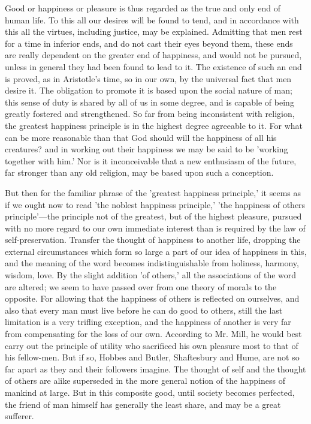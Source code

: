 \documentclass[11pt,letter]{article}
\begin{document}
\par  Good or happiness or pleasure is thus regarded as the true and only end of human life. To this all our desires will be found to tend, and in accordance with this all the virtues, including justice, may be explained. Admitting that men rest for a time in inferior ends, and do not cast their eyes beyond them, these ends are really dependent on the greater end of happiness, and would not be pursued, unless in general they had been found to lead to it. The existence of such an end is proved, as in Aristotle's time, so in our own, by the universal fact that men desire it. The obligation to promote it is based upon the social nature of man; this sense of duty is shared by all of us in some degree, and is capable of being greatly fostered and strengthened. So far from being inconsistent with religion, the greatest happiness principle is in the highest degree agreeable to it. For what can be more reasonable than that God should will the happiness of all his creatures? and in working out their happiness we may be said to be 'working together with him.' Nor is it inconceivable that a new enthusiasm of the future, far stronger than any old religion, may be based upon such a conception.

\par  But then for the familiar phrase of the 'greatest happiness principle,' it seems as if we ought now to read 'the noblest happiness principle,' 'the happiness of others principle'—the principle not of the greatest, but of the highest pleasure, pursued with no more regard to our own immediate interest than is required by the law of self-preservation. Transfer the thought of happiness to another life, dropping the external circumstances which form so large a part of our idea of happiness in this, and the meaning of the word becomes indistinguishable from holiness, harmony, wisdom, love. By the slight addition 'of others,' all the associations of the word are altered; we seem to have passed over from one theory of morals to the opposite. For allowing that the happiness of others is reflected on ourselves, and also that every man must live before he can do good to others, still the last limitation is a very trifling exception, and the happiness of another is very far from compensating for the loss of our own. According to Mr. Mill, he would best carry out the principle of utility who sacrificed his own pleasure most to that of his fellow-men. But if so, Hobbes and Butler, Shaftesbury and Hume, are not so far apart as they and their followers imagine. The thought of self and the thought of others are alike superseded in the more general notion of the happiness of mankind at large. But in this composite good, until society becomes perfected, the friend of man himself has generally the least share, and may be a great sufferer.
\end{document}
